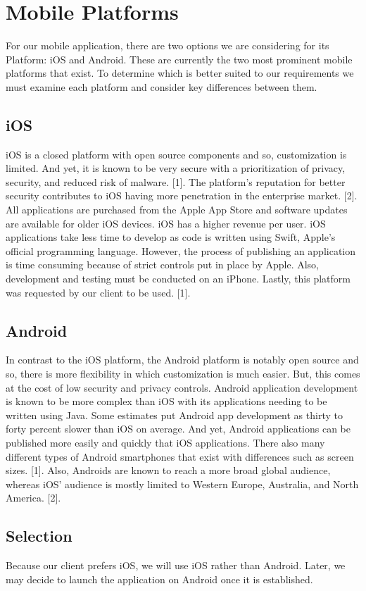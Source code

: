 \documentclass[onecolumn, draftclsnofoot,10pt, journal, letterpaper]{IEEEtran}
\begin{document}
\section{Mobile Platforms}
For our mobile application, there are two options we are considering for its Platform: iOS and Android. These are currently the two most prominent mobile platforms that exist. To determine which is better suited to our requirements we must examine each platform and consider key differences between them.
\subsection{iOS}
iOS is a closed platform with open source components and so, customization is limited. And yet, it is known to be very secure with a prioritization of privacy, security, and reduced risk of malware. [1]. The platform's reputation for better security contributes to iOS having more penetration in the enterprise market. [2]. All applications are purchased from the Apple App Store and software updates are available for older iOS devices. iOS has a higher revenue per user. iOS applications take less time to develop as code is written using Swift, Apple's official programming language. However, the process of publishing an application is time consuming because of strict controls put in place by Apple. Also, development and testing must be conducted on an iPhone. Lastly, this platform was requested by our client to be used. [1].
\subsection{Android}
In contrast to the iOS platform, the Android platform is notably open source and so, there is more flexibility in which customization is much easier. But, this comes at the cost of low security and privacy controls. Android application development is known to be more complex than iOS with its applications needing to be written using Java. Some estimates put Android app development as thirty to forty percent slower than iOS on average. And yet, Android applications can be published more easily and quickly that iOS applications. There also many different types of Android smartphones that exist with differences such as screen sizes. [1]. Also, Androids are known to reach a more broad global audience, whereas iOS' audience is mostly limited to Western Europe, Australia, and North America. [2].
\subsection{Selection}
Because our client prefers iOS, we will use iOS rather than Android. Later, we may decide to launch the application on Android once it is established.
\end{document}
